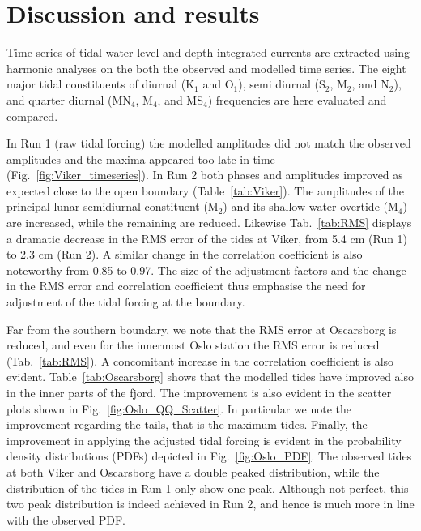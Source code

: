 \section{Discussion and results}
\label{sec:discuss}

Time series of tidal water level and depth integrated currents are extracted using harmonic analyses on the both the observed and modelled time series. The eight major tidal constituents of diurnal (K$_1$ and O$_1$), semi diurnal (S$_2$, M$_2$, and N$_2$), and quarter diurnal (MN$_4$, M$_4$, and MS$_4$) frequencies are here evaluated and compared. 

In Run 1 (raw tidal forcing) the modelled amplitudes did not match the observed amplitudes and the maxima appeared too late in time (Fig.~\ref{fig:Viker_timeseries}). In Run 2 both phases and amplitudes improved as expected close to the open boundary (Table~\ref{tab:Viker}). The amplitudes of the principal lunar semidiurnal constituent (M$_2$) and its shallow water overtide (M$_4$) are increased, while the remaining are reduced. Likewise Tab.~\ref{tab:RMS} displays a dramatic decrease in the RMS error of the tides at Viker, from 5.4 cm (Run 1) to 2.3 cm (Run 2). A similar change in the correlation coefficient is also noteworthy from 0.85 to 0.97. The size of the adjustment factors and the change in the RMS error and correlation coefficient thus emphasise the need for adjustment of the tidal forcing at the boundary. 

Far from the southern boundary, we note that the RMS error at Oscarsborg is reduced, and even for the innermost Oslo station the RMS error is reduced (Tab.~\ref{tab:RMS}). A concomitant increase in the correlation coefficient is also evident. Table~\ref{tab:Oscarsborg} shows that the modelled tides have improved also in the inner parts of the fjord. 
The improvement is also evident in the scatter plots shown in Fig.~\ref{fig:Oslo_QQ_Scatter}. In particular we note the improvement regarding the tails, that is the maximum tides. 
Finally, the improvement in applying the adjusted tidal forcing is evident in the probability density distributions (PDFs) depicted in Fig.~\ref{fig:Oslo_PDF}. The observed tides at both Viker and Oscarsborg have a double peaked distribution, while the distribution of the tides in Run 1 only show one peak. Although not perfect, this two peak distribution is indeed achieved in Run 2, and hence is much more in line with the observed PDF. 

